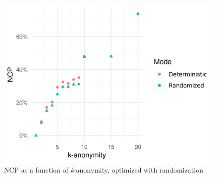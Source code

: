 \documentclass[a4paper]{scrreprt}
\begin{document}
\begin{figure}
		\centering
		\includegraphics[width=\textwidth]{resources/k_anonymity_ncp_randomized.png}
		\caption{NCP as a function of \emph{k}-anonymity, optimized with randomization}
		\label{fig:k_anonymity_ncp_randomized}
\end{figure}

\printbibliography
\end{document}
